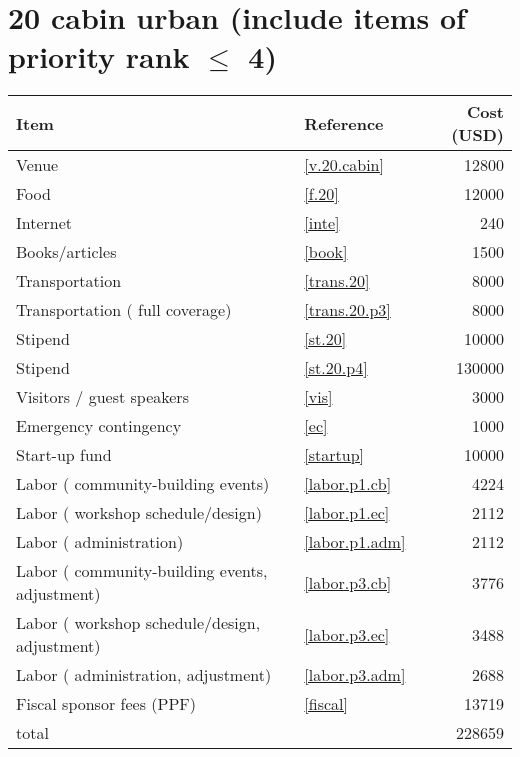 \section*{20 cabin urban (include items of priority rank $\leq$ 4)}
\begin{center}
\begin{tabular}{llr}
Item & Reference & Cost (USD) \\ \hline
Venue & \ref{v.20.cabin} & 12800 \\
Food & \ref{f.20} & 12000 \\
Internet & \ref{inte} & 240 \\
Books/articles & \ref{book} & 1500 \\
Transportation & \ref{trans.20} & 8000 \\
Transportation ( full coverage) & \ref{trans.20.p3} & 8000 \\
Stipend & \ref{st.20} & 10000 \\
Stipend & \ref{st.20.p4} & 130000 \\
Visitors / guest speakers & \ref{vis} & 3000 \\
Emergency contingency & \ref{ec} & 1000 \\
Start-up fund & \ref{startup} & 10000 \\
Labor ( community-building events) & \ref{labor.p1.cb} & 4224 \\
Labor ( workshop schedule/design) & \ref{labor.p1.ec} & 2112 \\
Labor ( administration) & \ref{labor.p1.adm} & 2112 \\
Labor ( community-building events, adjustment) & \ref{labor.p3.cb} & 3776 \\
Labor ( workshop schedule/design, adjustment) & \ref{labor.p3.ec} & 3488 \\
Labor ( administration, adjustment) & \ref{labor.p3.adm} & 2688 \\
Fiscal sponsor fees (PPF) & \ref{fiscal} & 13719 \\ \hline
total &  & 228659
\end{tabular}
\end{center}
\newpage
